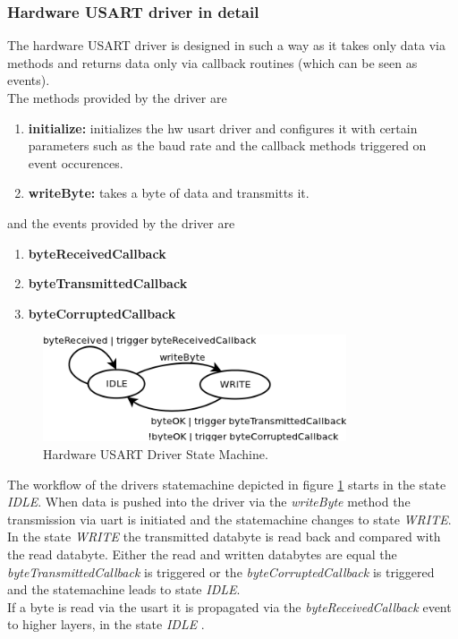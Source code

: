 \subsubsection{Hardware USART driver in detail}
\label{sec:bus:design:layer1:interface:hwuart}

The hardware USART driver is designed in such a way as it takes only data via methods and returns data only via callback routines (which can be seen as events).\\

The methods provided by the driver are

\begin{enumerate}
 \item \textbf{initialize: } initializes the hw usart driver and configures it with certain parameters such as the baud rate and the callback methods triggered on event occurences.
 \item \textbf{writeByte: } takes a byte of data and transmitts it.
\end{enumerate}

and the events provided by the driver are

\begin{enumerate}
 \item \textbf{byteReceivedCallback}
 \item \textbf{byteTransmittedCallback}
 \item \textbf{byteCorruptedCallback}
\end{enumerate}

\begin{figure}[h]
\centering
\includegraphics[width=0.8\textwidth]{../images/hwuart_statemachine.png}
\caption{Hardware USART Driver State Machine.}
\label{fig:bus:design:layer1:interface:hwuart}
\end{figure}

The workflow of the drivers statemachine depicted in figure \ref{fig:bus:design:layer1:interface:hwuart} starts in the state \textit{IDLE}.
When data is pushed into the driver via the \textit{writeByte} method the transmission via uart is initiated and the statemachine changes to state \textit{WRITE}.\\

In the state \textit{WRITE} the transmitted databyte is read back and compared with the read databyte. 
Either the read and written databytes are equal the \textit{byteTransmittedCallback} is triggered or the \textit{byteCorruptedCallback} is triggered and the statemachine leads to state \textit{IDLE}.\\

If a byte is read via the usart it is propagated via the \textit{byteReceivedCallback} event to higher layers, in the state \textit{IDLE} .\\
